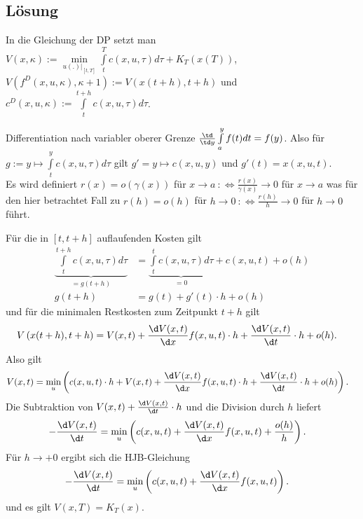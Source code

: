 \subsection{Lösung}
In die Gleichung der \ac{DP} setzt man $V(x, \kappa) := \min\limits_{u(.)|_{[t,T]}} \int\limits_t^T c(x, u, \tau)d\tau + K_T\left(x(T) \right)$, $V\left(f^D(x, u, \kappa),\kappa + 1
\right) := V\left(x(t+h),t+h \right)$ und $c^D(x,u,\kappa):=\int\limits_t^{t+h}c(x,u,\tau)d\tau$. 
\begin{remark}
Differentiation nach variabler oberer Grenze $\frac{\td }{\td y}\int\limits_a^y f(t)dt=f(y)$. Also für $g:=y\mapsto\int\limits_t^y c(x,u,\tau)d\tau$ gilt $g'=y\mapsto c(x,u,y)$ und
$g'(t)=x(x,u,t)$.\\
Es wird definiert $r(x)=o(\gamma(x))$ für $x\rightarrow a\ :\Leftrightarrow\frac{r(x)}{\gamma(x)}\rightarrow 0$ für $x\rightarrow a$ was für den hier betrachtet Fall zu $r(h)=o(h)$ für
$h\rightarrow 0\ :\Leftrightarrow\frac{r(h)}{h}\rightarrow 0$ für $h\rightarrow 0$ führt.
\end{remark}
Für die in $[t,t+h]$ auflaufenden Kosten gilt
\begin{align}
	\underbrace{\int\limits_t^{t+h}c(x,u,\tau)d\tau }_{=g(t+h)} & = \underbrace{\int\limits_{t}^tc(x,u,\tau)d\tau }_{=0}+c(x,u,t)+o(h)\\
	g(t+h) & = g(t) + g'(t)\cdot h + o(h)
\end{align}
und für die minimalen Restkosten zum Zeitpunkt $t+h$ gilt
\begin{align}
	V\left(x(t+h),t+h \right) & = V(x,t)+\frac{\d V(x,t)}{\d x}f(x,u,t)\cdot h + \frac{\d V(x,t)}{\d t}\cdot h + o(h).
\end{align}
Also gilt
\begin{align}
	V(x,t) & = \min\limits_u\left(c(x,u,t)\cdot h + V(x,t) + \frac{\d V(x,t)}{\d x}f(x,u,t)\cdot h + \frac{\d V(x,t)}{\d t}\cdot h + o(h) \right).
\end{align}
Die Subtraktion von $V(x,t)+\frac{\d V(x,t)}{\d t}\cdot h$ und die Division durch $h$ liefert 
\begin{align}
	-\frac{\d V(x,t)}{\d t} & = \min\limits_u\left(c(x,u,t) + \frac{\d V(x,t)}{\d x}f(x,u,t)+\frac{o(h)}{h} \right).
\end{align}
Für $h\rightarrow +0$ ergibt sich die \ac{HJB}-Gleichung 
\begin{align*}
	-\frac{\d V(x,t)}{\d t} & = \min\limits_u\left(c(x,u,t) + \frac{\d V(x,t)}{\d x}f(x,u,t) \right).	
\end{align*}
und es gilt $V(x,T)=K_T(x)$.

